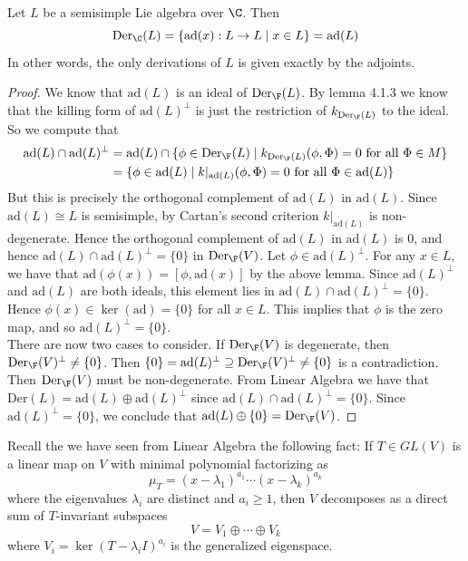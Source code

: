 \documentclass[a4paper]{article}
\begin{document}
\begin{prp}{}{} \\Let $L$ be a semisimple Lie algebra over $\C$. Then $$\text{Der}_\C(L)=\{\text{ad}(x):L\to L\;|\;x\in L\}=\text{ad}(L)$$ In other words, the only derivations of $L$ is given exactly by the adjoints. 
\begin{proof}
We know that $\text{ad}(L)$ is an ideal of $\text{Der}_\F(L)$. By lemma 4.1.3 we know that the killing form of $\text{ad}(L)^\perp$ is just the restriction of $k_{\text{Der}_\F(L)}$ to the ideal. So we compute that 
\begin{align*}
\text{ad}(L)\cap\text{ad}(L)^\perp&=\text{ad}(L)\cap\{\phi\in\text{Der}_\F(L)\;|\;k_{\text{Der}_\F(L)}(\phi,\Phi)=0\text{ for all }\Phi\in M\}\\
&=\{\phi\in\text{ad}(L)\;|\;k|_{\text{ad}(L)}(\phi,\Phi)=0\text{ for all }\Phi\in\text{ad}(L)\}
\end{align*}
But this is precisely the orthogonal complement of $\text{ad}(L)$ in $\text{ad}(L)$. Since $\text{ad}(L)\cong L$ is semisimple, by Cartan's second criterion $k|_{\text{ad}(L)}$ is non-degenerate. Hence the orthogonal complement of $\text{ad}(L)$ in $\text{ad}(L)$ is $0$, and hence $\text{ad}(L)\cap\text{ad}(L)^\perp=\{0\}$ in $\text{Der}_\F(V)$. Let $\phi\in\text{ad}(L)^\perp$. For any $x\in L$, we have that $\text{ad}(\phi(x))=[\phi,\text{ad}(x)]$ by the above lemma. Since $\text{ad}(L)^\perp$ and $\text{ad}(L)$ are both ideals, this element lies in $\text{ad}(L)\cap\text{ad}(L)^\perp=\{0\}$. Hence $\phi(x)\in\ker(\text{ad})=\{0\}$ for all $x\in L$. This implies that $\phi$ is the zero map, and so $\text{ad}(L)^\perp=\{0\}$. \\

There are now two cases to consider. If $\text{Der}_\F(V)$ is degenerate, then $\text{Der}_\F(V)^\perp\neq\{0\}$. Then $\{0\}=\text{ad}(L)^\perp\supseteq\text{Der}_\F(V)^\perp\neq\{0\}$ is a contradiction. Then $\text{Der}_\F(V)$ must be non-degenerate. From Linear Algebra we have that $\text{Der}(L)=\text{ad}(L)\oplus\text{ad}(L)^\perp$ since $\text{ad}(L)\cap\text{ad}(L)^\perp=\{0\}$. Since $\text{ad}(L)^\perp=\{0\}$, we conclude that $\text{ad}(L)\oplus\{0\}=\text{Der}_\F(V)$. 
\end{proof}
\end{prp}

Recall the we have seen from Linear Algebra the following fact: If $T\in GL(V)$ is a linear map on $V$ with minimal polynomial factorizing as $$\mu_T=(x-\lambda_1)^{a_1}\cdots(x-\lambda_k)^{a_k}$$ where the eigenvalues $\lambda_i$ are distinct and $a_i\geq 1$, then $V$ decomposes as a direct sum of $T$-invariant subspaces $$V=V_1\oplus\cdots\oplus V_k$$ where $V_i=\ker(T-\lambda_i I)^{a_i}$ is the generalized eigenspace. 
\end{document}
